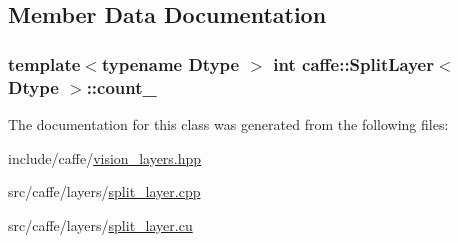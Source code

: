 \subsection{Member Data Documentation}
\hypertarget{classcaffe_1_1_split_layer_a61d5ab69fcee07756a4a4655b33f3f75}{
\subsubsection[{count\+\_\+}]{\setlength{\rightskip}{0pt plus 5cm}template$<$typename Dtype $>$ int {\bf caffe\+::\+Split\+Layer}$<$ Dtype $>$\+::count\+\_\+\hspace{0.3cm}{\ttfamily [protected]}}}\label{classcaffe_1_1_split_layer_a61d5ab69fcee07756a4a4655b33f3f75}


The documentation for this class was generated from the following files\+:\begin{DoxyCompactItemize}
\item 
include/caffe/\hyperlink{vision__layers_8hpp}{vision\+\_\+layers.\+hpp}\item 
src/caffe/layers/\hyperlink{split__layer_8cpp}{split\+\_\+layer.\+cpp}\item 
src/caffe/layers/\hyperlink{split__layer_8cu}{split\+\_\+layer.\+cu}\end{DoxyCompactItemize}
